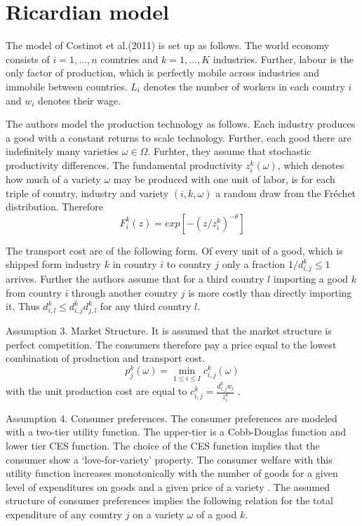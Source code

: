 \section{Ricardian model}
\label{sec:Ricardo}
The model of Costinot et al.(2011) is set up as follows. The world economy consists of  $i = 1, \dots, n$ countries and $k = 1, \dots , K $ industries. Further, labour is the only factor of production, which is perfectly mobile across industries and immobile between countries. $L_i $ denotes the number of workers in each country $i$  and $ w_i $ denotes their wage. \par %
The authors model the production technology as follows.  Each industry produces a good with a constant returns to scale technology. Further, each good there are indefinitely many varieties $\omega \in \Omega$.  Furhter, they assume that stochastic productivity differences. The fundamental productivity $z_i^k(\omega)$, which denotes how much of a variety $\omega$ may be produced with one unit of labor,  is for each triple of country, industry and variety $(i,k,\omega)$ a random draw from the Fr{\'e}chet distribution. Therefore \[ F^k_i (z) = exp [-(z/z^{k}_i )^{-\theta} ] \] \par
The transport cost are of the following form. Of every unit of a good, which is shipped form industry $k$ in country $i$ to country $j$ only a fraction $1/d^k_{i,j} \leq 1$ arrives. Further the authors assume that for a third country $l$ importing a good $k$ from country $i$ through another country $j$ is more costly than directly importing it. Thus $d^k_{i,l} \leq d^k_{i,j} d^k_{j,l} $ for any third country $l$. \par
Assumption 3. Market Structure. It is assumed that the market structure is perfect competition. The consumers therefore pay a price equal to the lowest combination of production and transport cost. \[p^k_j(\omega)=\min_{1\leq i \leq I} {c_{i,j}^k(\omega)} \] with the unit production cost are equal to $c^k_{i,j}=\frac{d^k_{i,j} w_i}{z_i^k}$ . \par
Assumption 4. Consumer preferences. The consumer preferences are modeled with a  two-tier utility function. The upper-tier is a Cobb-Douglas function and lower tier CES function. 
The choice of the CES function implies that the consumer show a `love-for-variety' property. The consumer welfare with this utility function increases monotonically with the number of goods  for a given level of expenditures on goods and a given price of a variety   \textcite[p. 118]{helpman}. The assumed structure of consumer preferences implies the following relation for the total expenditure of any country $j$ on a variety $\omega$ of a good $k$. 
